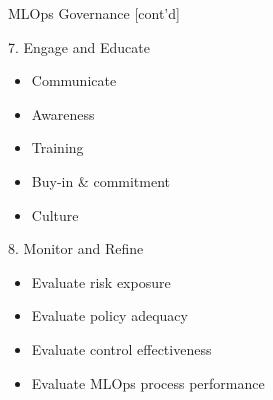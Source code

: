 \documentclass[ignorenonframetext,xcolor=x11names]{beamer}
\begin{document}
\begin{frame}{MLOps Governance \small [cont'd]}
\footnotesize
\begin{block}{7. Engage and Educate}
\begin{itemize}
   \item Communicate
   \item Awareness
   \item Training
   \item Buy-in \& commitment
   \item Culture
\end{itemize}
\end{block}

\begin{block}{8. Monitor and Refine}
\begin{itemize}
   \item Evaluate risk exposure
   \item Evaluate policy adequacy
   \item Evaluate control effectiveness
   \item Evaluate MLOps process performance
\end{itemize}
\end{block}
\end{frame}
\end{document}

